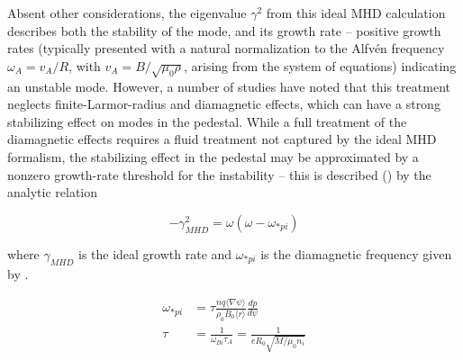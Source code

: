 \begin{figure}[t]
 \pushtooutside
\end{figure}

Absent other considerations, the eigenvalue $\gamma^2$ from this ideal MHD calculation describes both the stability of the mode, and its growth rate -- positive growth rates (typically presented with a natural normalization to the Alfv\'en frequency $\omega_A = v_A/R$, with $v_A = B/\sqrt{\mu_0 \rho}$, arising from the system of equations) indicating an unstable mode.  However, a number of studies \cite{Rogers1999,Huysmans2001,Snyder2003} have noted that this treatment neglects finite-Larmor-radius and diamagnetic effects, which can have a strong stabilizing effect on modes in the pedestal.  While a full treatment of the diamagnetic effects requires a fluid treatment not captured by the ideal MHD formalism, the stabilizing effect in the pedestal may be approximated by a nonzero growth-rate threshold for the instability -- this is described (\cf \cite{Snyder2002}) by the analytic relation

\begin{equation}\label{eq:pb_diamag}
 -\gamma_{MHD}^2 = \omega(\omega - \omega_{*pi})
\end{equation}

\noindent where $\gamma_{MHD}$ is the ideal growth rate and $\omega_{*pi}$ is the diamagnetic frequency given by \cite{Snyder2009,Huysmans2001,Huysmans2005}.

\begin{equation}\label{eq:omegastar}
 \begin{aligned}
  \omega_{*pi} &= \tau \frac{nq \langle \nabla \psi \rangle}{\rho_0 B_0 \langle r \rangle} \frac{dp}{d\psi}\\
  \tau &= \frac{1}{\omega_{Bi} \tau_A} = \frac{1}{eR_0 \sqrt{M/\mu_0 n_i}}
 \end{aligned}
\end{equation}

